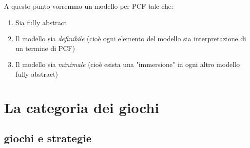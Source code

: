 \documentclass{beamer}
\begin{document}
\begin{frame}
	

	
	A questo punto vorremmo un modello per PCF tale che:
	\begin{enumerate}
		\item Sia fully abstract
		\item Il modello sia \emph{definibile} (cioè ogni elemento del modello sia interpretazione di un termine di PCF)
		\item Il modello sia \emph{minimale} (cioè esista una "immersione" in ogni altro modello fully abstract)
	\end{enumerate}
	
	

\end{frame}


\section{La categoria dei giochi}


\subsection{giochi e strategie}
\end{document}
